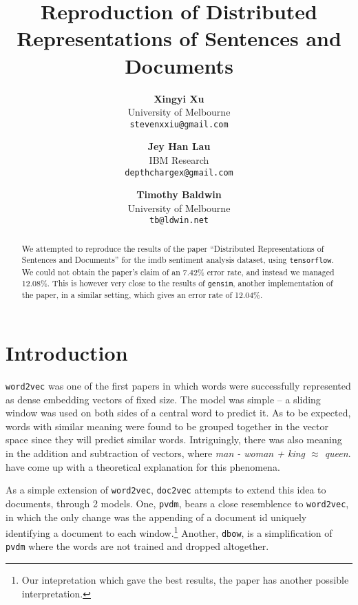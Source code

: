 \documentclass{article}
\begin{document}
\title{Reproduction of Distributed Representations of Sentences and Documents}

\author{
  \textbf{Xingyi Xu} \\ University of Melbourne \\ \texttt{stevenxxiu@gmail.com} \and
  \textbf{Jey Han Lau} \\ IBM Research \\ \texttt{depthchargex@gmail.com} \and
  \textbf{Timothy Baldwin} \\ University of Melbourne \\ \texttt{tb@ldwin.net}
}
\maketitle

\begin{abstract}
We attempted to reproduce the results of the paper ``Distributed Representations of Sentences and Documents'' for the imdb sentiment analysis dataset, using \texttt{tensorflow}. We could not obtain the paper's claim of an 7.42\% error rate, and instead we managed 12.08\%. This is however very close to the results of \texttt{gensim}, another implementation of the paper, in a similar setting, which gives an error rate of 12.04\%.
\end{abstract}

\section{Introduction}
\texttt{word2vec} \citep{mikolov_distributed_2013} was one of the first papers in which words were successfully represented as dense embedding vectors of fixed size. The model was simple -- a sliding window was used on both sides of a central word to predict it. As to be expected, words with similar meaning were found to be grouped together in the vector space since they will predict similar words. Intriguingly, there was also meaning in the addition and subtraction of vectors, where \textit{man - woman + king $\approx$ queen}. \cite{arora_rand-walk:_2015} have come up with a theoretical explanation for this phenomena.

As a simple extension of \texttt{word2vec}, \texttt{doc2vec} \citep{le_distributed_2014} attempts to extend this idea to documents, through 2 models. One, \texttt{pvdm}, bears a close resemblence to \texttt{word2vec}, in which the only change was the appending of a document id uniquely identifying a document to each window.\footnote{Our intepretation which gave the best results, the paper has another possible interpretation.} Another, \texttt{dbow}, is a simplification of \texttt{pvdm} where the words are not trained and dropped altogether.
\end{document}
